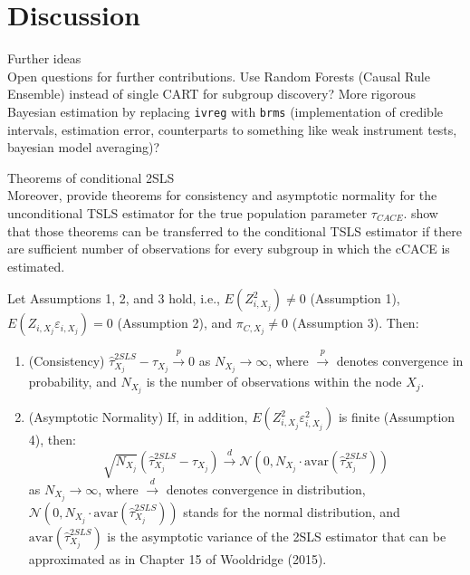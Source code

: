 \chapter{Discussion}


Further ideas \\

Open questions for further contributions. Use Random Forests (Causal Rule Ensemble) instead of single CART for subgroup discovery? 
More rigorous Bayesian estimation by replacing \texttt{ivreg} with \texttt{brms} (implementation of credible intervals, estimation error, counterparts to something like weak instrument tests, bayesian model averaging)? 



Theorems of conditional 2SLS \\ 

Moreover, \cite{Wooldridge2015} provide theorems for consistency and asymptotic normality for the unconditional TSLS estimator for the true population parameter $\tau_{CACE}$. \cite{bargagli-stoffi_heterogeneous_2022} show that those theorems can be transferred to the conditional TSLS estimator if there are sufficient number of observations for every subgroup in which the cCACE is estimated. 

\begin{thm}
   Let Assumptions 1, 2, and 3 hold, i.e., \(E(Z^2_{i,X_j}) \neq 0\) (Assumption 1), \(E(Z_{i,X_j} \varepsilon_{i,X_j}) = 0\) (Assumption 2), and \(\pi_{C,X_j} \neq 0\) (Assumption 3). Then:
   \begin{enumerate}
       \item (Consistency) \( \hat{\tau}^{2SLS}_{X_j} - \tau_{X_j} \overset{p}{\to} 0 \) as \( N_{X_j} \to \infty \), where \( \overset{p}{\to} \) denotes convergence in probability, and \( N_{X_j} \) is the number of observations within the node \( X_j \).
       \item (Asymptotic Normality) If, in addition, \(E(Z^2_{i,X_j} \varepsilon^2_{i,X_j})\) is finite (Assumption 4), then:
       \[
       \sqrt{N_{X_j}} (\hat{\tau}^{2SLS}_{X_j} - \tau_{X_j}) \overset{d}{\to} \mathcal{N}(0, N_{X_j} \cdot \text{avar}(\hat{\tau}^{2SLS}_{X_j}))
       \]
       as \(N_{X_j} \to \infty\), where \( \overset{d}{\to} \) denotes convergence in distribution, \( \mathcal{N}(0, N_{X_j} \cdot \text{avar}(\hat{\tau}^{2SLS}_{X_j})) \) stands for the normal distribution, and \(\text{avar}(\hat{\tau}^{2SLS}_{X_j})\) is the asymptotic variance of the 2SLS estimator that can be approximated as in Chapter 15 of Wooldridge (2015).
   \end{enumerate}
\end{thm}